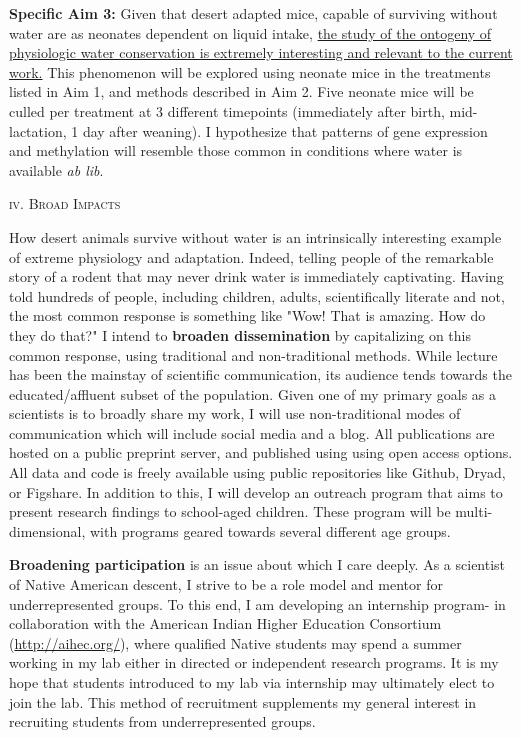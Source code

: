 \documentclass[11pt]{article}
\begin{document}
\textbf{Specific Aim 3:} Given that desert adapted mice, capable of surviving without water are as neonates dependent on liquid intake, \ul{the study of the ontogeny of physiologic water conservation is extremely interesting and relevant to the current work.} This phenomenon will be explored using neonate mice in the treatments listed in Aim 1, and methods described in Aim 2. Five neonate mice will be culled per treatment at 3 different timepoints (immediately after birth, mid-lactation, 1 day after weaning). I hypothesize that patterns of gene expression and methylation will resemble those common in conditions where water is available \textit{ab lib}.  
\begin{center}
\textsc{{iv. Broad Impacts}} \\
\end{center}
How desert animals survive without water is an intrinsically interesting example of extreme physiology and adaptation. Indeed, telling people of the remarkable story of a rodent that may never drink water is immediately captivating. Having told hundreds of people, including children, adults, scientifically literate and not, the most common response is something like "Wow! That is amazing. How do they do that?" I intend to \textbf{broaden dissemination} by capitalizing on this common response, using traditional and non-traditional methods. While lecture has been the mainstay of scientific communication, its audience tends towards the educated/affluent subset of the population. Given one of my primary goals as a scientists is to broadly share my work, I will use non-traditional modes of communication which will include social media and a blog. All publications are hosted on a public preprint server, and published using using open access options. All data and code is freely available using public repositories like Github, Dryad, or Figshare. In addition to this, I will develop an outreach program that aims to present research findings to school-aged children. These program will be multi-dimensional, with programs geared towards several different age groups. 

\textbf{Broadening participation} is an issue about which I care deeply. As a scientist of Native American descent, I strive to be a role model and mentor for underrepresented groups. To this end, I am developing an internship program- in collaboration with the American Indian Higher Education Consortium (\url{http://aihec.org/}), where qualified Native students may spend a summer working in my lab either in directed or independent research programs. It is my hope that students introduced to my lab via internship may ultimately elect to join the lab. This method of recruitment supplements my general interest in recruiting students from underrepresented groups. 
\end{document}
